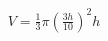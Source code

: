 \documentclass[preview]{standalone}
\begin{document}
\begin{align*}
V = \frac{1}{3} \pi \left(\frac{3h}{10}\right)^2 h
\end{align*}
\end{document}
